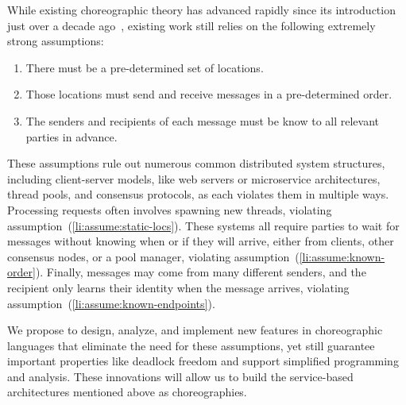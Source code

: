 
While existing choreographic theory has advanced rapidly since its introduction just over a decade ago~\citep{CarboneM13,HirschG22,CruzFilipeGLMP22,CruzFilipeGLMP23,BatesK+25,SamuelsonHC25},
existing work still relies on the following extremely strong assumptions:
\begin{enumerate}
  \item\label{li:assume:static-locs}
    There must be a pre-determined set of locations.
  \item\label{li:assume:known-order}
    Those locations must send and receive messages in a pre-determined order.
  \item\label{li:assume:known-endpoints}
    The senders and recipients of each message must be know to all relevant parties in advance.
\end{enumerate}

These assumptions rule out numerous common distributed system structures,
including client-server models, like web servers or microservice architectures, thread pools, and consensus protocols, as each violates them in multiple ways.
Processing requests often involves spawning new threads, violating assumption~(\ref{li:assume:static-locs}).
These systems all require parties to wait for messages without knowing when or if they will arrive,
either from clients, other consensus nodes, or a pool manager, violating assumption~(\ref{li:assume:known-order}).
Finally, messages may come from many different senders, and the recipient only learns their identity when the message arrives,
violating assumption~(\ref{li:assume:known-endpoints}).

We propose to design, analyze, and implement new features in choreographic languages that eliminate the need for these assumptions,
yet still guarantee important properties like deadlock freedom and support simplified programming and analysis.
These innovations will allow us to build the service-based architectures mentioned above as choreographies.

